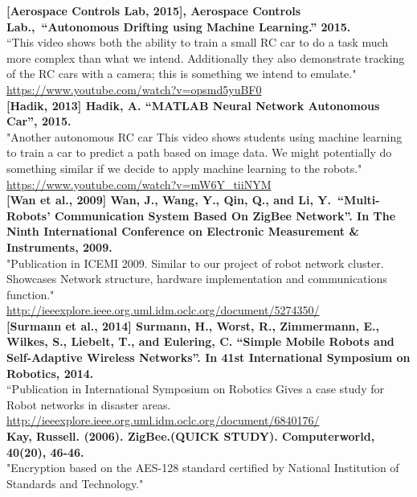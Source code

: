 \documentclass[a4paper]{article}
\begin{document}
	\textbf{[Aerospace Controls Lab, 2015], Aerospace Controls Lab., “Autonomous Drifting using Machine Learning.” 2015.}\\
	“This video shows both the ability to train a small RC car to do a task much more complex than what we intend. Additionally they also demonstrate tracking of the RC cars with a camera; this is something we intend to emulate." \\
	\href{URL}{https://www.youtube.com/watch?v=opsmd5yuBF0}\\
		
	\textbf{[Hadik, 2013] Hadik, A. “MATLAB Neural Network Autonomous Car”, 2015.}\\
	"Another autonomous RC car This video shows students using machine learning to train a car to predict a path based on image data. We might potentially do something similar if we decide to apply machine learning to the robots."\\
	\href{URL}{https://www.youtube.com/watch?v=mW6Y\_tiiNYM}\\
		
	\textbf{[Wan et al., 2009] Wan, J., Wang, Y., Qin, Q., and Li, Y. “Multi-Robots’ Communication System Based On ZigBee Network”. In The Ninth International Conference on Electronic Measurement \& Instruments, 2009.}\\
	"Publication in ICEMI 2009. Similar to our project of robot network cluster. Showcases Network structure, hardware implementation and communications function."\\ \href{URL}{http://ieeexplore.ieee.org.uml.idm.oclc.org/document/5274350/}\\
		
	\textbf{[Surmann et al., 2014] Surmann, H., Worst, R., Zimmermann, E., Wilkes, S., Liebelt, T., and Eulering, C. “Simple Mobile Robots and Self-Adaptive Wireless Networks”. In 41st International Symposium on Robotics, 2014.}\\
	“Publication in International Symposium on Robotics Gives a case study for Robot networks in disaster areas.\\ 
	\href{URL}{http://ieeexplore.ieee.org.uml.idm.oclc.org/document/6840176/}\\
	
	\textbf{Kay, Russell. (2006). ZigBee.(QUICK STUDY). Computerworld, 40(20), 46-46.}\\
	"Encryption based on the AES-128 standard certified by National Institution of Standards and
	Technology."\\
	
\end{document}
